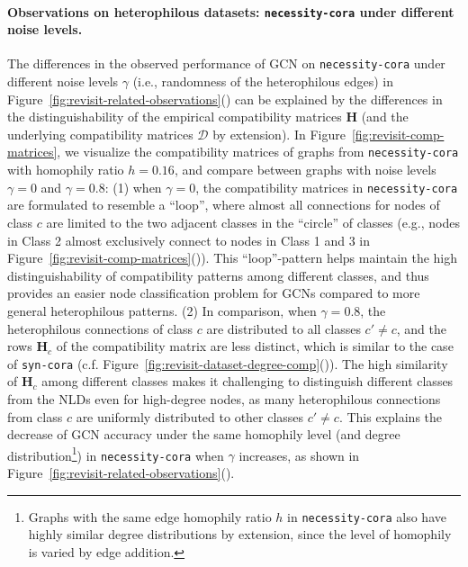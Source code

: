 \paragraph{Observations on heterophilous datasets: \texttt{necessity-cora} under different noise levels.} 
The differences in the observed performance of GCN on \texttt{necessity-cora} under different noise levels $\gamma$ (i.e., randomness of the heterophilous edges) in Figure~\ref{fig:revisit-related-observations}() can be explained by
the differences in the distinguishability of the empirical compatibility matrices $\mathbf{H}$ (and the underlying compatibility matrices $\mathcal{D}$ by extension). In Figure~\ref{fig:revisit-comp-matrices}, we visualize the compatibility matrices of graphs from \texttt{necessity-cora} 
with homophily ratio $h=0.16$, and compare between graphs with noise levels $\gamma=0$ and $\gamma=0.8$:
(1) when $\gamma=0$, the compatibility matrices in \texttt{necessity-cora} are formulated to resemble a ``loop'', where almost all connections for nodes of class $c$ are limited to the two adjacent classes in the ``circle'' of classes (e.g., nodes in Class 2 almost exclusively connect to nodes in Class 1 and 3 in Figure~\ref{fig:revisit-comp-matrices}()). 
This ``loop''-pattern helps maintain the high distinguishability of compatibility patterns among different classes, and thus provides an easier node classification problem for GCNs compared to more general heterophilous patterns.
(2) In comparison, when $\gamma=0.8$, the heterophilous connections of class $c$ 
are distributed to all classes $c'\neq c$, and the rows $\mathbf{H}_c$ of the compatibility matrix are less distinct,
which is similar to the case of \texttt{syn-cora} (c.f. Figure~\ref{fig:revisit-dataset-degree-comp}()).
The high similarity of $\mathbf{H}_c$ among different classes makes it challenging to distinguish different classes from the NLDs even for high-degree nodes, as many heterophilous connections from class $c$ are uniformly distributed to other classes $c'\neq c$. 
This explains the decrease of GCN accuracy under the same homophily level (and degree distribution\footnote{Graphs with the same edge homophily ratio $h$ in \texttt{necessity-cora} also have highly similar degree distributions by extension, since the level of homophily is varied by edge addition.}) in \texttt{necessity-cora} when $\gamma$ increases, as shown in Figure~\ref{fig:revisit-related-observations}().



